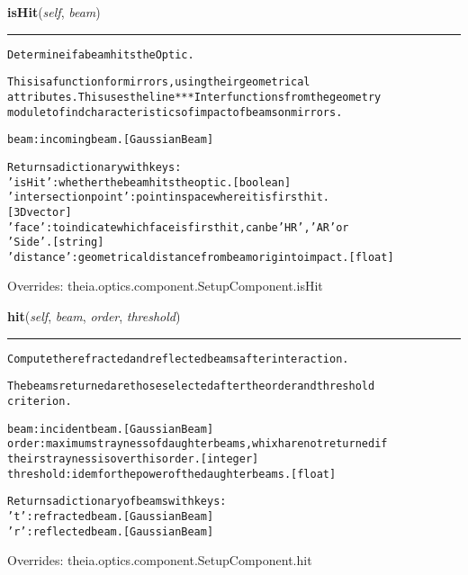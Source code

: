     \vspace{0.5ex}

\hspace{.8\funcindent}\begin{boxedminipage}{\funcwidth}

    \raggedright \textbf{isHit}(\textit{self}, \textit{beam})

    \vspace{-1.5ex}

    \rule{\textwidth}{0.5\fboxrule}
\setlength{\parskip}{2ex}
\begin{alltt}
Determine if a beam hits the Optic.

This is a function for mirrors, using their geometrical
attributes. This uses the line***Inter functions from the geometry
module to find characteristics of impact of beams on mirrors.

beam: incoming beam. [GaussianBeam]

Returns a dictionary with keys:
    'isHit': whether the beam hits the optic. [boolean]
    'intersection point': point in space where it is first hit.
            [3D vector]
    'face': to indicate which face is first hit, can be 'HR', 'AR' or
        'Side'. [string]
    'distance': geometrical distance from beam origin to impact. [float]
\end{alltt}

\setlength{\parskip}{1ex}
      Overrides: theia.optics.component.SetupComponent.isHit

    \end{boxedminipage}

    \vspace{0.5ex}

\hspace{.8\funcindent}\begin{boxedminipage}{\funcwidth}

    \raggedright \textbf{hit}(\textit{self}, \textit{beam}, \textit{order}, \textit{threshold})

    \vspace{-1.5ex}

    \rule{\textwidth}{0.5\fboxrule}
\setlength{\parskip}{2ex}
\begin{alltt}
Compute the refracted and reflected beams after interaction.

The beams returned are those selected after the order and threshold
criterion.

beam: incident beam. [GaussianBeam]
order: maximum strayness of daughter beams, whixh are not returned if
    their strayness is over this order. [integer]
threshold: idem for the power of the daughter beams. [float]

Returns a dictionary of beams with keys:
    't': refracted beam. [GaussianBeam]
    'r': reflected beam. [GaussianBeam]
\end{alltt}

\setlength{\parskip}{1ex}
      Overrides: theia.optics.component.SetupComponent.hit

    \end{boxedminipage}

